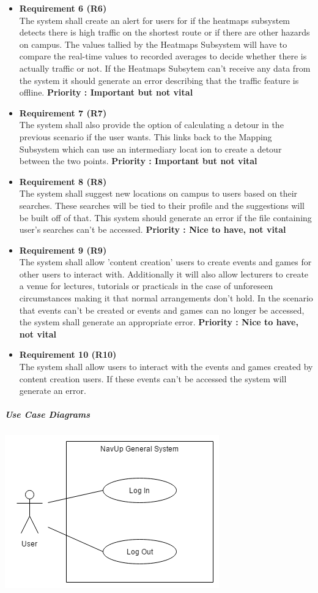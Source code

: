 \documentclass[english]{article}
\begin{document}
\begin{itemize}
					    \item \textbf{Requirement 6 (R6)}\\ The system shall create an alert for users for if the heatmaps subsystem detects there is high traffic on the shortest route or if there are other hazards on campus. The values tallied by the Heatmaps Subsystem will have to compare the real-time values to recorded averages to decide whether there is actually traffic or not. If the Heatmaps Subsytem can't receive any data from the system it should generate an error describing that the traffic feature is offline. \textbf{Priority : Important but not vital}
					    \item \textbf{Requirement 7 (R7)}\\ The system shall also provide the option of calculating a detour in the previous scenario if the user wants. This links back to the Mapping Subsystem which can use an intermediary location to create a detour between the two points. \textbf{Priority : Important but not vital}
					    \item \textbf{Requirement 8 (R8)}\\ The system shall suggest new locations on campus to users based on their searches. These searches will be tied to their profile and the suggestions will be built off of that. This system should generate an error if the file containing user's searches can't be accessed. \textbf{Priority : Nice to have, not vital}
					    \item \textbf{Requirement 9 (R9)}\\ The system shall allow 'content creation' users to create events and games for other users to interact with. Additionally it will also allow lecturers to create a venue for lectures, tutorials or practicals in the case of unforeseen circumstances making it that normal arrangements don't hold. In the scenario that events can't be created or events and games can no longer be accessed, the system shall generate an appropriate error. 
					    \textbf{Priority : Nice to have, not vital}
					    \item \textbf{Requirement 10 (R10)} \\ The system shall allow users to interact with the events and games created by content creation users. If these events can't be accessed the system will generate
					    an error.
					\end{itemize}
				    \subparagraph{Use Case Diagrams}
				       \includegraphics{NavUp_General.png}
\end{document}
